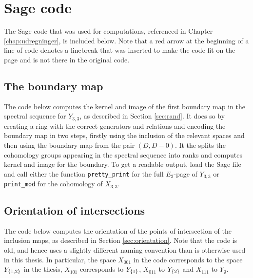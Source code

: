 
\chapter{Sage code} 
\label{appendix:sage}

The Sage code that was used for computations, referenced in Chapter
\ref{chap:udregninger}, is included below. Note that a red arrow at
the beginning of a line of code denotes a linebreak that was inserted
to make the code fit on the page and is not there in the original
code.

\section{The boundary map}
\label{sec:sageboundary}

The code below computes the kernel and image of the first boundary map
in the spectral sequence for $Y_{3,3}$, as described in Section
\ref{sec:rand}. It does so by creating a ring with the correct
generators and relations and encoding the boundary map in two steps,
firstly using the inclusion of the relevant spaces and then using the
boundary map from the pair $(D,D-0)$. It the splits the cohomology
groups appearing in the spectral sequence into ranks and computes
kernel and image for the boundary. To get a readable output, load the
Sage file and call either the function \lstinline{pretty_print} for
the full $E_2$-page of $Y_{3,3}$ or \lstinline{print_mod} for the
cohomology of $X_{3,3}$.




\section{Orientation of intersections}
\label{sec:sageorientation}

The code below computes the orientation of the points of intersection
of the inclusion maps, as described in Section
\ref{sec:orientation}. Note that the code is old, and hence uses a
slightly different naming convention than is otherwise used in this
thesis. In particular, the space $X_{001}$ in the code corresponds to
the space $Y_{\left\{ 1,2 \right\}}$ in the thesis, $X_{101}$ corresponds to
$Y_{\left\{ 1 \right\}}$, $X_{011}$ to $Y_{\left\{ 2 \right\}}$ and $X_{111}$ to $Y_{\emptyset}$.




